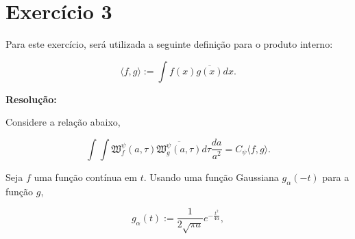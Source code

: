 
\section*{\large Exercício 3}
%



Para este exercício, será utilizada a seguinte definição para o produto interno:

\begin{equation*}
\langle f, g \rangle := \int f(x) \overline{g(x)}dx.
\end{equation*}

\textbf{Resolução:}

Considere a relação abaixo,

\begin{equation*}
\int \int \mathfrak{W}_{f}^{\psi}(a,\tau)\overline{\mathfrak{W}_{g}^{\psi}(a,\tau)}d \tau \frac{d a}{a^{2}} = C_{\psi}\langle f, g \rangle.
\end{equation*}

Seja $f$ uma função contínua em $t$. Usando uma função Gaussiana $g_{\alpha}(-t)$ para a função $g$, 

\begin{equation*}
g_{\alpha}(t) := \frac{1}{2\sqrt{\pi a}} e^{-\frac{t^{2}}{4\alpha}},
\end{equation*}

